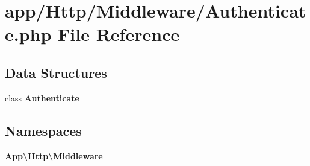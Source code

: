 \section{app/\+Http/\+Middleware/\+Authenticate.php File Reference}
\label{_authenticate_8php}
\subsection*{Data Structures}
\begin{DoxyCompactItemize}
\item 
class {\bf Authenticate}
\end{DoxyCompactItemize}
\subsection*{Namespaces}
\begin{DoxyCompactItemize}
\item 
 {\bf App\textbackslash{}\+Http\textbackslash{}\+Middleware}
\end{DoxyCompactItemize}
